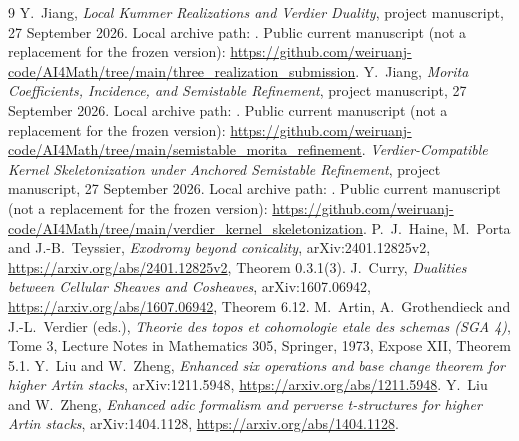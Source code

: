 \documentclass[11pt]{article}
\theoremstyle{definition}
\theoremstyle{remark}
\begin{document}
\begin{thebibliography}{9}
Y.~Jiang, \emph{Local Kummer Realizations and Verdier Duality},
project manuscript, 27 September 2026. Local archive path:
. Public current manuscript
(not a replacement for the frozen version):
\url{https://github.com/weiruanj-code/AI4Math/tree/main/three_realization_submission}.
Y.~Jiang, \emph{Morita Coefficients, Incidence, and Semistable Refinement},
project manuscript, 27 September 2026. Local archive path:
. Public current manuscript
(not a replacement for the frozen version):
\url{https://github.com/weiruanj-code/AI4Math/tree/main/semistable_morita_refinement}.
\emph{Verdier-Compatible Kernel Skeletonization under Anchored
Semistable Refinement}, project manuscript, 27 September 2026.
Local archive path: . Public
current manuscript (not a replacement for the frozen version):
\url{https://github.com/weiruanj-code/AI4Math/tree/main/verdier_kernel_skeletonization}.
P.~J.~Haine, M.~Porta and J.-B.~Teyssier,
\emph{Exodromy beyond conicality}, arXiv:2401.12825v2,
\url{https://arxiv.org/abs/2401.12825v2}, Theorem 0.3.1(3).
J.~Curry, \emph{Dualities between Cellular Sheaves and Cosheaves},
arXiv:1607.06942, \url{https://arxiv.org/abs/1607.06942}, Theorem 6.12.
M.~Artin, A.~Grothendieck and J.-L.~Verdier (eds.),
\emph{Theorie des topos et cohomologie etale des schemas (SGA 4)},
Tome 3, Lecture Notes in Mathematics 305, Springer, 1973,
Expose XII, Theorem 5.1.
Y.~Liu and W.~Zheng, \emph{Enhanced six operations and base change
theorem for higher Artin stacks}, arXiv:1211.5948,
\url{https://arxiv.org/abs/1211.5948}.
Y.~Liu and W.~Zheng, \emph{Enhanced adic formalism and perverse
t-structures for higher Artin stacks}, arXiv:1404.1128,
\url{https://arxiv.org/abs/1404.1128}.
\end{thebibliography}
\end{document}
